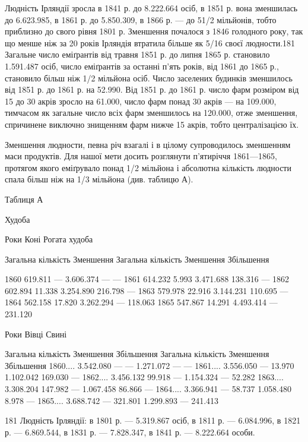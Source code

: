 Людність Ірляндії зросла в 1841 р. до 8.222.664 осіб, в 1851 р.
вона зменшилась до 6.623.985, в 1861 р. до 5.850.309, в 1866 р. —
до 51/2 мільйонів, тобто приблизно до свого рівня 1801 р. Зменшення
почалося з 1846 голодного року, так що менше ніж за
20 років Ірляндія втратила більше як 5/16 своєї людности.181
Загальне число еміґрантів від травня 1851 р. до липня 1865 р.
становило 1.591.487 осіб, число еміґрантів за останні п’ять років,
від 1861 до 1865 р., становило більш ніж 1/2 мільйона осіб. Число
заселених будинків зменшилось від 1851 р. до 1861 р. на 52.990.
Від 1851 р. до 1861 р. число фарм розміром від 15 до 30 акрів зросло
на 61.000, число фарм понад 30 акрів — на 109.000, тимчасом
як загальне число всіх фарм зменшилось на 120.000, отже зменшення,
спричинене виключно знищенням фарм нижче 15 акрів,
тобто централізацією їх.

Зменшення людности, певна річ взагалі і в цілому супроводилось
зменшенням маси продуктів. Для нашої мети досить
розглянути п’ятиріччя 1861—1865, протягом якого еміґрувало
понад 1/2 мільйона і абсолютна кількість людности спала
більш ніж на 1/3 мільйона (див. таблицю А).

Таблиця А

Худоба

Роки    Коні    Рогата худоба

    Загальна кількість    Зменшення    Загальна кількість    Зменшення    Збільшення

1860                619.811              —                    3.606.374                       —     
                 —
1861                614.232           5.993                 3.471.688                 138.316       
          —
1862                602.894          11.338                3.254.890                 216.798        
         —
1863                579.978          22.916                3.144.231                 110.695        
         —
1864                562.158          17.820                3.262.294                       —        
        118.063
1865                547.867          14.291                4.493.414                       —        
         231.120

Роки    Вівці            Свині

    Загальна кількість    Зменшення    Збільшення    Загальна кількість    Зменшення    Збільшення
1860....    3.542.080         —                   —              1.271.072          —               
      —
1861....    3.556.050         —               13.970         1.102.042       169.030               —
1862....    3.456.132      99.918             —              1.154.324         —                  
52.282
1863....    3.308.204     147.982            —              1.067.458        86.866                —
1864....    3.366.941        —                58.737         1.058.480       8.978                  
—
1865....    3.688.742        —                321.801       1.299.893         —                
241.413

181 Людність Ірляндії: в 1801 р. — 5.319.867 осіб, в 1811 р. — 6.084.996,
в 1821 р. — 6.869.544, в 1831 р. — 7.828.347, в 1841 р. — 8.222.664 особи.

